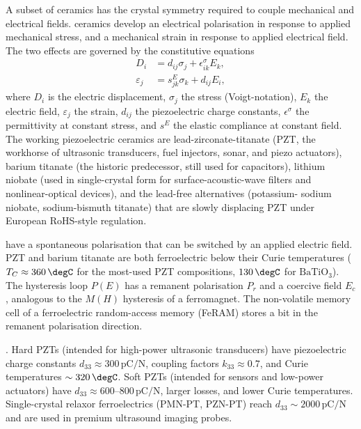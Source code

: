 A subset of ceramics has the crystal symmetry required to couple
mechanical and electrical fields.  ceramics
develop an electrical polarisation in response to applied mechanical
stress, and a mechanical strain in response to applied electrical
field. The two effects are governed by the constitutive equations
\begin{align*}
D_i &= d_{ij} \sigma_j + \epsilon^{\sigma}_{ik} E_k, \\
\varepsilon_j &= s^E_{jk} \sigma_k + d_{ij} E_i,
\end{align*}
where $D_i$ is the electric displacement, $\sigma_j$ the stress
(Voigt-notation), $E_k$ the electric field, $\varepsilon_j$ the
strain, $d_{ij}$ the piezoelectric charge constants, $\epsilon^\sigma$
the permittivity at constant stress, and $s^E$ the elastic compliance
at constant field. The working piezoelectric ceramics are
lead-zirconate-titanate (PZT, the workhorse of ultrasonic transducers,
fuel injectors, sonar, and piezo actuators), barium titanate (the
historic predecessor, still used for capacitors), lithium niobate (used
in single-crystal form for surface-acoustic-wave filters and
nonlinear-optical devices), and the lead-free alternatives (potassium-
sodium niobate, sodium-bismuth titanate) that are slowly displacing
PZT under European RoHS-style regulation.

 have a spontaneous polarisation that
can be switched by an applied electric field. PZT and barium titanate
are both ferroelectric below their Curie temperatures ($T_C \approx
360\,\degC$ for the most-used PZT compositions, $130\,\degC$ for
$\mathrm{BaTiO_3}$). The hysteresis loop $P(E)$ has a remanent
polarisation $P_r$ and a coercive field $E_c$, analogous to the
$M(H)$ hysteresis of a ferromagnet. The non-volatile memory cell of a
ferroelectric random-access memory (FeRAM) stores a bit in the
remanent polarisation direction.

. Hard PZTs (intended for high-power
ultrasonic transducers) have piezoelectric charge constants $d_{33}
\approx 300\,\text{pC}/\text{N}$, coupling factors $k_{33} \approx
0.7$, and Curie temperatures $\sim 320\,\degC$. Soft PZTs (intended
for sensors and low-power actuators) have $d_{33} \approx 600$--$800\,
\text{pC}/\text{N}$, larger losses, and lower Curie temperatures.
Single-crystal relaxor ferroelectrics (PMN-PT, PZN-PT) reach $d_{33}
\sim 2000\,\text{pC}/\text{N}$ and are used in premium ultrasound
imaging probes.


